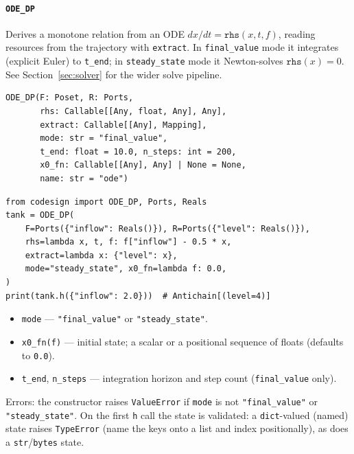 \documentclass[11pt,a4paper]{article}
\begin{document}
\paragraph{\texttt{ODE\_DP}}
\label{ref:dp:ode_dp}
Derives a monotone relation from an ODE $dx/dt = \texttt{rhs}(x, t, f)$,
reading resources from the trajectory with \texttt{extract}. In
\texttt{final\_value} mode it integrates (explicit Euler) to
\texttt{t\_end}; in \texttt{steady\_state} mode it Newton-solves
$\texttt{rhs}(x)=0$. See Section~\ref{sec:solver} for the wider
solve pipeline.
\begin{lstlisting}
ODE_DP(F: Poset, R: Ports,
       rhs: Callable[[Any, float, Any], Any],
       extract: Callable[[Any], Mapping],
       mode: str = "final_value",
       t_end: float = 10.0, n_steps: int = 200,
       x0_fn: Callable[[Any], Any] | None = None,
       name: str = "ode")
\end{lstlisting}
\begin{lstlisting}
from codesign import ODE_DP, Ports, Reals
tank = ODE_DP(
    F=Ports({"inflow": Reals()}), R=Ports({"level": Reals()}),
    rhs=lambda x, t, f: f["inflow"] - 0.5 * x,
    extract=lambda x: {"level": x},
    mode="steady_state", x0_fn=lambda f: 0.0,
)
print(tank.h({"inflow": 2.0}))  # Antichain[(level=4)]
\end{lstlisting}
\begin{itemize}[nosep]
  \item \texttt{mode} --- \texttt{"final\_value"} or
        \texttt{"steady\_state"}.
  \item \texttt{x0\_fn(f)} --- initial state; a scalar or a positional
        sequence of floats (defaults to \texttt{0.0}).
  \item \texttt{t\_end}, \texttt{n\_steps} --- integration horizon and
        step count (\texttt{final\_value} only).
\end{itemize}
Errors: the constructor raises \texttt{ValueError} if \texttt{mode} is
not \texttt{"final\_value"} or \texttt{"steady\_state"}. On the first
\texttt{h} call the state is validated: a \texttt{dict}-valued (named)
state raises \texttt{TypeError} (name the keys onto a list and index
positionally), as does a \texttt{str}/\texttt{bytes} state.
\end{document}
